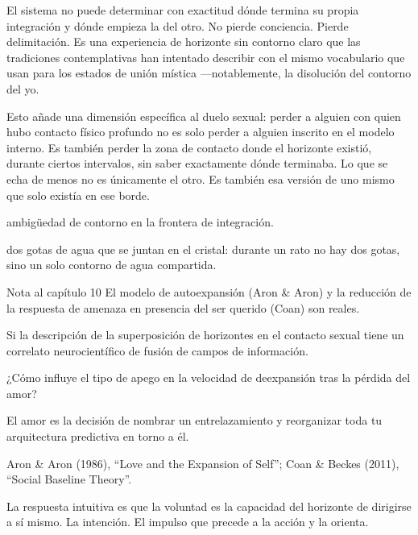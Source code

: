 El sistema no puede determinar con exactitud dónde termina su propia integración y dónde empieza la del otro. No pierde conciencia. Pierde delimitación. Es una experiencia de horizonte sin contorno claro que las tradiciones contemplativas han intentado describir con el mismo vocabulario que usan para los estados de unión mística —notablemente, la disolución del contorno del yo.

Esto añade una dimensión específica al duelo sexual: perder a alguien con quien hubo contacto físico profundo no es solo perder a alguien inscrito en el modelo interno. Es también perder la zona de contacto donde el horizonte existió, durante ciertos intervalos, sin saber exactamente dónde terminaba. Lo que se echa de menos no es únicamente el otro. Es también esa versión de uno mismo que solo existía en ese borde.

\begin{fisica}
 ambigüedad de contorno en la frontera de integración.

 dos gotas de agua que se juntan en el cristal: durante un rato no hay dos gotas, sino un solo contorno de agua compartida.
\end{fisica}
\begin{notacap}{Nota al capítulo 10}
 El modelo de autoexpansión (Aron \& Aron) y la reducción de la respuesta de amenaza en presencia del ser querido (Coan) son reales.

 Si la descripción de la superposición de horizontes en el contacto sexual tiene un correlato neurocientífico de fusión de campos de información.

 ¿Cómo influye el tipo de apego en la velocidad de deexpansión tras la pérdida del amor?

 El amor es la decisión de nombrar un entrelazamiento y reorganizar toda tu arquitectura predictiva en torno a él.

 Aron \& Aron (1986), “Love and the Expansion of Self”; Coan \& Beckes (2011), “Social Baseline Theory”.
\end{notacap}
\noindent {}

\noindent La respuesta intuitiva es que la voluntad es la capacidad del horizonte de dirigirse a sí mismo. La intención. El impulso que precede a la acción y la orienta.

